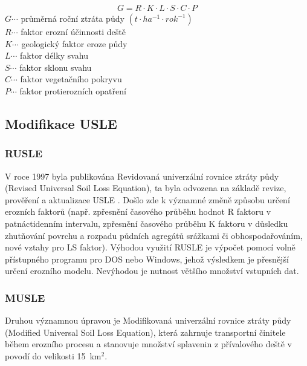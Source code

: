 \begin{align}
   \label{usle1978} G=R\cdot K\cdot L\cdot S\cdot C\cdot P
\end{align}
\hspace*{2cm}$G \cdots$ průměrná roční ztráta půdy $\left( t\cdot ha^{-1}\cdot rok^{-1} \right)$\\
\hspace*{2cm}$R \cdots$ faktor erozní účinnosti deště \\
\hspace*{2cm}$K \cdots$ geologický faktor eroze půdy \\ 
\hspace*{2cm}$L \cdots$ faktor délky svahu \\ 
\hspace*{2cm}$S \cdots$ faktor sklonu svahu \\  
\hspace*{2cm}$C \cdots$ faktor vegetačního pokryvu \\
\hspace*{2cm}$P \cdots$ faktor protierozních opatření \\

\subsection{Modifikace USLE}
\subsubsection{RUSLE}
V roce 1997 byla publikována Revidovaná univerzální rovnice ztráty půdy (Revised Universal Soil Loss Equation), ta byla odvozena na základě revize, prověření a aktualizace USLE  . Došlo zde k významné změně způsobu určení erozních faktorů (např. zpřesnění časového průběhu hodnot R faktoru v patnáctidenním intervalu, zpřesnění časového průběhu K faktoru v důsledku zhutňování povrchu a rozpadu půdních agregátů srážkami či obhospodařováním, nové vztahy pro LS faktor). Výhodou využití RUSLE je výpočet pomocí volně přístupného programu pro DOS nebo Windows, jehož výsledkem je přesnější určení erozního modelu. Nevýhodou je nutnost většího množství vstupních dat.\cite{rusle1997}
\subsubsection{MUSLE}
Druhou významnou úpravou je Modifikovaná univerzální rovnice ztráty půdy (Modified Universal Soil Loss Equation), která zahrnuje transportní činitele během erozního procesu a stanovuje množství splavenin z přívalového deště v povodí do velikosti 15~km$^{2}$.\cite{musle1945}

